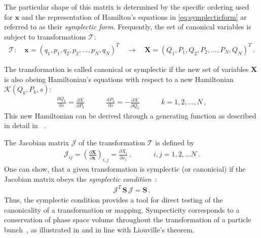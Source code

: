 The particular shape of this matrix is determined by the specific ordering used for $\mathbf{x}$ and the representation of Hamilton's equations in \eqref{eq:symplecticform} ar referred to as their \textit{symplectic form}. Frequently, the set of canonical variables is subject to transformations $\mathcal{T}$:
\begin{align}
\mathcal{T}:  \quad \mathbf{x} = (q_1,p_1,q_2,p_2,...,p_N,q_N)^T \quad \rightarrow \quad \mathbf{X} = (Q_1,P_1,Q_2,P_2,...,P_N,Q_N)^T \, .
\end{align}






The transformation is called canonical or symplectic if the new set of variables $\mathbf{X}$ is also obeing Hamiltonian's equations with respect to a new Hamiltonian $\mathcal{K}(Q_k,P_k,s)$:
\begin{align}
\frac{\mathrm{d} Q_k}{\mathrm{d}s} = \frac{\partial \mathcal{K}}{\partial P_k} \quad \quad \quad \frac{\mathrm{d} P_k}{\mathrm{d}s} = -\frac{\partial \mathcal{K}}{\partial Q_k} \quad \quad \quad k=1,2,...,N\, ,
\end{align}
This new Hamiltonian can be derived through a generating function as described in detail in ~\cite{}. 

The Jacobian matrix $\mathcal{J}$ of the transformation $\mathcal{T}$ is defined by~\cite{CERN-SL-95-12} 
\begin{align}
\mathcal{J}_{ij} = \left( \frac{\partial \mathbf{X}}{\partial \mathbf{x}} \right)_{i,j} = \frac{\partial X_i}{\partial x_j} \, , \quad \quad \quad i,j=1,2,...N \, .
\end{align}
One can show, that a given transformation is symplectic (or canonicial) if the Jacobian matrix obeys the \emph{symplectic condition}~\cite{CERN-SL-95-12}:
\begin{align}
\mathcal{J}^T \, \mathbf{S} \, \mathcal{J} =  \mathbf{S} \, .
\end{align} 
Thus, the symplectic condition provides a tool for direct testing of the canonicality of a transformation or mapping. Sympecticity corresponds to a conservation of phase space volume throughout the transformation of a particle bunch~\cite{wolski2014beam}, as illustrated in  and in line with Liouville's theorem. 


